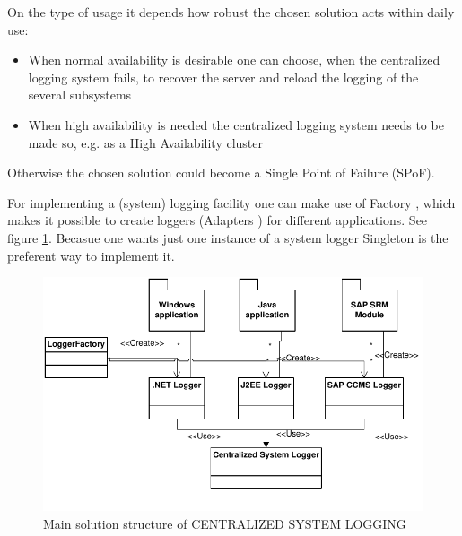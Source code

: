 On the type of usage it depends how robust the chosen solution acts within daily use:
\begin{itemize}
	\item When normal availability is desirable one can choose, when the  centralized logging system fails, to recover the server and reload the logging of the several subsystems
	\item When high availability is needed the centralized logging system needs to be made so, e.g. as a High Availability cluster
\end{itemize}
Otherwise the chosen solution could become a Single Point of Failure (SPoF).

For implementing a (system) logging facility one can make use of {\sc  Factory} \cite{Gamma95}, which makes it possible to create loggers ({\sc  Adapters} \cite{Gamma95}) for different applications. See figure \ref{fig:systemLogging}. Becasue one wants just one instance of a system logger {\sc  Singleton} \cite{Gamma95} is the preferent way to implement it.

\begin{figure}[h]
\centering
\includegraphics{patterns/systemLoggingDiagram.pdf}
\caption{Main solution structure of CENTRALIZED SYSTEM LOGGING}
\label{fig:systemLogging}
\end{figure}


